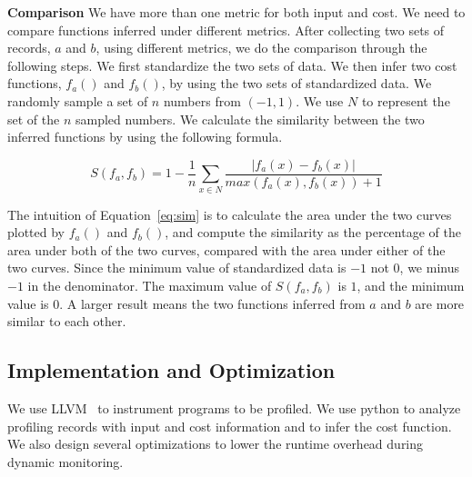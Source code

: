 \noindent\textbf{Comparison}
We have more than one metric for both input and cost.
We need to compare functions inferred under different metrics. 
After collecting two sets of records, $a$ and $b$, using different metrics, 
we do the comparison through the following steps. 
We first standardize the two sets of data. 
We then infer two cost functions, $f_a()$ and $f_b()$, 
by using the two sets of standardized data.
We randomly sample a set of $n$ numbers from $(-1, 1)$.
We use $N$ to represent the set of the $n$ sampled numbers.  
We calculate the similarity between the two inferred 
functions by using the following formula. 



\begin{equation} \label{eq:sim}
S(f_a, f_b) = 1 - \frac{1}{n}\sum_{x \in N}\frac{|f_a(x) - f_b(x)|}{max(f_a(x),f_b(x))+1}
\end{equation}

The intuition of Equation~\ref{eq:sim} is to calculate the area under the two curves 
plotted by $f_a()$ and $f_b()$, 
and compute the similarity as the percentage of the area under both of the two curves, 
compared with the area under either of the two curves.
Since the minimum value of standardized data is $-1$ not $0$,
we minus $-1$ in the denominator.
The maximum value of $S(f_a, f_b)$ is $1$, and the minimum value is $0$.
A larger result means the two functions inferred 
from $a$ and $b$ are more similar to each other. 



\subsection{Implementation and Optimization}

We use LLVM~\cite{llvm} to instrument programs to be profiled.
We use python to analyze profiling records 
with input and cost information and to infer the cost function. 
We also design several optimizations to lower the runtime overhead 
during dynamic monitoring.  


